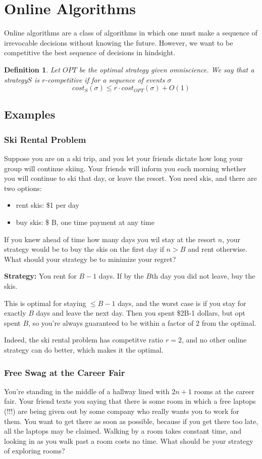 \documentclass[11pt]{article}
\newtheorem{definition}[theorem]{Definition}
\begin{document}
\section{Online Algorithms}
Online algorithms are a class of algorithms in which one must make a sequence of irrevocable decisions without knowing the future. However, we want to be competitive the best sequence of decisions in hindsight. 

\begin{definition}
Let $OPT$ be the optimal strategy given omniscience. We say that a strategy$S$ is $r$-competitive if for a sequence of events $\sigma$
\[cost_{S}(\sigma) \le r\cdot cost_{OPT}(\sigma) + O(1)\]
\end{definition}

\subsection{Examples}
\subsubsection{Ski Rental Problem}
Suppose you are on a ski trip, and you let your friends dictate how long your group will continue skiing. Your friends will inform you each morning whether you will continue to ski that day, or leave the resort. You need skis, and there are two options:
\begin{itemize}
    \item rent skis: \$1 per day
    \item buy skis: \$ B, one time payment at any time
\end{itemize}

If you knew ahead of time how many days you wil stay at the resort $n$, your strategy would be to buy the skis on the first day if $n>B$ and rent otherwise. What should your strategy be to minimize your regret?

\textbf{Strategy:}
You rent for $B-1$ days. If by the $B$th day you did not leave, buy the skis.

This is optimal for staying $\le B-1$ days, and the worst case is if you stay for exactly $B$ days and leave the next day. Then you spent \$2B-1 dollars, but opt spent $B$, so you're always guaranteed to be within a factor of $2$ from the optimal.

Indeed, the ski rental problem has competitve ratio $r=2$, and no other online strategy can do better, which makes it the optimal.

\subsubsection{Free Swag at the Career Fair}
You're standing in the middle of a hallway lined with $2n+1$ rooms at the career fair. Your friend texts you saying that there is some room in which a free laptops (!!!) are being given out by some company who really wants you to work for them. You want to get there as soon as possible, because if you get there too late, all the laptops may be claimed. Walking by a room takes constant time, and looking in as you walk past a room costs no time. What should be your strategy of exploring rooms?
\end{document}
